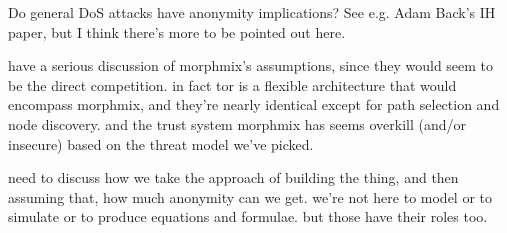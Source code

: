 Do general DoS attacks have anonymity implications? See e.g. Adam
Back's IH paper, but I think there's more to be pointed out here.


have a serious discussion of morphmix's assumptions, since they would
seem to be the direct competition. in fact tor is a flexible architecture
that would encompass morphmix, and they're nearly identical except for
path selection and node discovery. and the trust system morphmix has
seems overkill (and/or insecure) based on the threat model we've picked.

need to discuss how we take the approach of building the thing, and then
assuming that, how much anonymity can we get. we're not here to model or
to simulate or to produce equations and formulae. but those have their
roles too.

